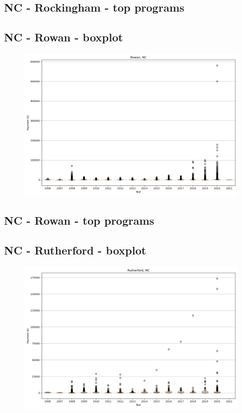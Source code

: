\subsection*{NC - Rockingham - top programs}

\newpage
\subsection*{NC - Rowan - boxplot}
\begin{figure}[h]
\centering
\includegraphics[width=7in]{../output/boxplots/counties/Rowan-NC_boxplot.png}
\end{figure}


\subsection*{NC - Rowan - top programs}

\newpage
\subsection*{NC - Rutherford - boxplot}
\begin{figure}[h]
\centering
\includegraphics[width=7in]{../output/boxplots/counties/Rutherford-NC_boxplot.png}
\end{figure}


